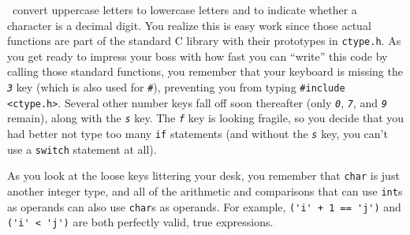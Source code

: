 \transitionone\ convert uppercase letters to lowercase letters and to indicate whether a character is a decimal digit.
You realize this is easy work since those actual functions are part of the standard C library with their prototypes in \texttt{ctype.h}.
As you get ready to impress your boss with how fast you can ``write'' this code by calling those standard functions, you remember that your keyboard is missing the \textit{\texttt{3}} key (which is also used for \textit{\texttt{\#}}), preventing you from typing \lstinline{#include <ctype.h>}.
Several other number keys fall off soon thereafter (only \textit{\texttt{0}}, \textit{\texttt{7}}, and \textit{\texttt{9}} remain), along with the \textit{\texttt{s}} key.
The \textit{\texttt{f}} key is looking fragile, so you decide that you had better not type too many \lstinline{if} statements (and without the \textit{\texttt{s}} key, you can't use a \lstinline{switch} statement at all).

As you look at the loose keys littering your desk, you remember that \lstinline{char} is just another integer type,
and all of the arithmetic and comparisons that can use \lstinline{int}s as operands can also use \lstinline{char}s as operands.
For example, \lstinline{('i' + 1 == 'j')} and \lstinline{('i' < 'j')} are both perfectly valid, true expressions.

